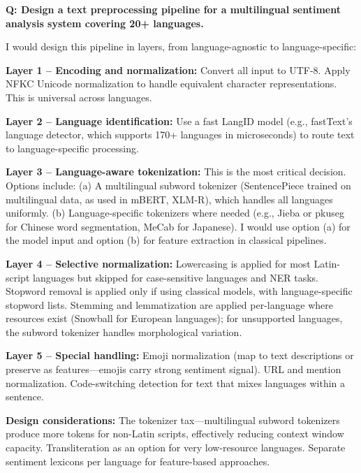 \begin{interviewq}
\textbf{Q: Design a text preprocessing pipeline for a multilingual sentiment analysis system covering 20+ languages.}

 \quad {} \quad \badgefreq{\freqmed}

\stronganswer
I would design this pipeline in layers, from language-agnostic to language-specific:

\textbf{Layer 1 -- Encoding and normalization:} Convert all input to UTF-8. Apply NFKC
Unicode normalization to handle equivalent character representations. This is universal
across languages.

\textbf{Layer 2 -- Language identification:} Use a fast LangID model (e.g., fastText's
language detector, which supports 170+ languages in microseconds) to route text to
language-specific processing.

\textbf{Layer 3 -- Language-aware tokenization:} This is the most critical decision.
Options include: (a) A multilingual subword tokenizer (SentencePiece trained on
multilingual data, as used in mBERT, XLM-R), which handles all languages uniformly. (b)
Language-specific tokenizers where needed (e.g., Jieba or pkuseg for Chinese word
segmentation, MeCab for Japanese). I would use option (a) for the model input and option
(b) for feature extraction in classical pipelines.

\textbf{Layer 4 -- Selective normalization:} Lowercasing is applied for most Latin-script
languages but skipped for case-sensitive languages and NER tasks. Stopword removal is
applied only if using classical models, with language-specific stopword lists. Stemming
and lemmatization are applied per-language where resources exist (Snowball for European
languages); for unsupported languages, the subword tokenizer handles morphological
variation.

\textbf{Layer 5 -- Special handling:} Emoji normalization (map to text descriptions or
preserve as features---emojis carry strong sentiment signal). URL and mention
normalization. Code-switching detection for text that mixes languages within a sentence.

\textbf{Design considerations:} The tokenizer tax---multilingual subword tokenizers produce
more tokens for non-Latin scripts, effectively reducing context window capacity.
Transliteration as an option for very low-resource languages. Separate sentiment lexicons
per language for feature-based approaches.


\end{interviewq}
